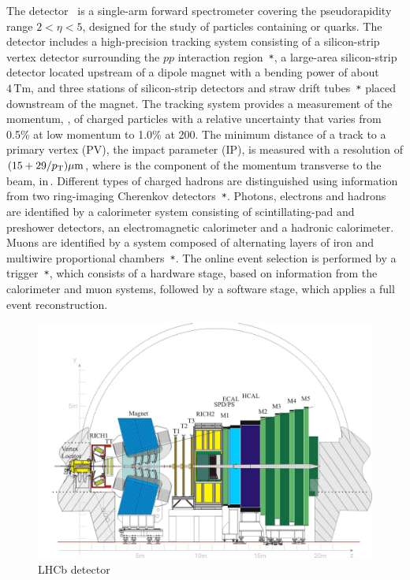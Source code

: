 The \lhcb detector~\cite{Alves:2008zz,Aaij:2014jba} is a single-arm forward
spectrometer covering the \mbox{pseudorapidity} range $2<\eta <5$,
designed for the study of particles containing \bquark or \cquark
quarks. The detector includes a high-precision tracking system
consisting of a silicon-strip vertex detector surrounding the $pp$
interaction region~\cite{LHCb-DP-2014-001}\verb!*!, a large-area silicon-strip detector located
upstream of a dipole magnet with a bending power of about
$4{\mathrm{\,Tm}}$, and three stations of silicon-strip detectors and straw
drift tubes~\cite{LHCb-DP-2013-003}\verb!*! placed downstream of the magnet.
The tracking system provides a measurement of the momentum, \ptot, of charged particles with
a relative uncertainty that varies from 0.5\% at low momentum to 1.0\% at 200\gevc.
The minimum distance of a track to a primary vertex (PV), the impact parameter (IP),
is measured with a resolution of $(15+29/\mbox{$p_{\rm T}$})\rm \mu m$,
where \pt is the component of the momentum transverse to the beam, in\,\gevc.
Different types of charged hadrons are distinguished using information
from two ring-imaging Cherenkov detectors~\cite{LHCb-DP-2012-003}\verb!*!.
Photons, electrons and hadrons are identified by a calorimeter system consisting of
scintillating-pad and preshower detectors, an electromagnetic
calorimeter and a hadronic calorimeter. Muons are identified by a
system composed of alternating layers of iron and multiwire
proportional chambers~\cite{LHCb-DP-2012-002}\verb!*!.
The online event selection is performed by a trigger~\cite{LHCb-DP-2012-004}\verb!*!,
which consists of a hardware stage, based on information from the calorimeter and muon
systems, followed by a software stage, which applies a full event
reconstruction.


\begin{figure} [htb!]
\begin{center}
\includegraphics[scale=0.2]{figs/lhcb-slide.jpg}
\caption{LHCb detector \label{fig:LHCb}}
\end{center}
\end{figure}

